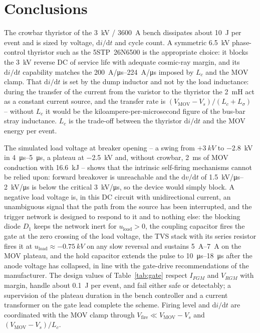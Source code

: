 \documentclass[11pt,a4paper]{article}
\begin{document}
\section{Conclusions}

The crowbar thyristor of the \SI{3}{kV} / \SI{3600}{A} bench dissipates about \SI{10}{J} per
event and is sized by voltage, $\mathrm{d}i/\mathrm{d}t$ and cycle count. A symmetric
\SI{6.5}{kV} phase-control thyristor such as the 5STP~26N6500 is the appropriate choice: it
blocks the \SI{3}{kV} reverse DC of service life with adequate cosmic-ray margin, and its
$\mathrm{d}i/\mathrm{d}t$ capability matches the \SIrange{200}{224}{A/\micro s} imposed by $L_c$
and the MOV clamp. That $\mathrm{d}i/\mathrm{d}t$ is set by the dump inductor and not by the load
inductance: during the transfer of the current from the varistor to the thyristor the \SI{2}{mH}
act as a constant current source, and the transfer rate is
$(V_{\mathrm{MOV}} - V_s)/(L_c + L_\sigma)$ -- without $L_c$ it would be the kiloampere-per-microsecond
figure of the bus-bar stray inductance. $L_c$ is the trade-off between the thyristor
$\mathrm{d}i/\mathrm{d}t$ and the MOV energy per event.

The simulated load voltage at breaker opening -- a swing from $+\SI{3}{kV}$ to \SI{-2.8}{kV} in
\SIrange{4}{5}{\micro s}, a plateau at \SI{-2.5}{kV} and, without crowbar, \SI{2}{ms} of MOV
conduction with \SI{16.6}{kJ} -- shows that the intrinsic self-firing mechanisms cannot be relied
upon: forward breakover is unreachable and the $\mathrm{d}v/\mathrm{d}t$ of \SIrange{1.5}{2}{kV/\micro s}
is below the critical \SI{3}{kV/\micro s}, so the device would simply block. A negative load
voltage is, in this DC circuit with unidirectional current, an unambiguous signal that the path
from the source has been interrupted, and the trigger network is designed to respond to it and to
nothing else: the blocking diode $D_1$ keeps the network inert for $u_{\mathrm{load}} > 0$, the
coupling capacitor fires the gate at the zero crossing of the load voltage, the TVS stack with its
series resistor fires it at $u_{\mathrm{load}} \approx \SI{-0.75}{kV}$ on any slow reversal and
sustains \SIrange{5}{7}{A} on the MOV plateau, and the hold capacitor extends the pulse to
\SIrange{10}{18}{\micro s} after the anode voltage has collapsed, in line with the gate-drive
recommendations of the manufacturer. The design values of Table~\ref{tab:gate} respect
$I_{FGM}$ and $V_{RGM}$ with margin, handle about \SI{0.1}{J} per event, and fail either safe or
detectably; a supervision of the plateau duration in the bench controller and a current
transformer on the gate lead complete the scheme. Firing level and $\mathrm{d}i/\mathrm{d}t$ are
coordinated with the MOV clamp through $V_{\mathrm{fire}} \ll V_{\mathrm{MOV}} - V_s$ and
$(V_{\mathrm{MOV}} - V_s)/L_c$.
\end{document}
